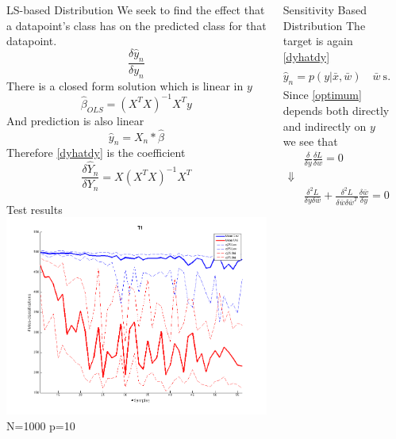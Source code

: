 \documentclass{beamer}
\newenvironment{pblock}{\begin{minipage}[b]{\linewidth}
	\begin{block}}{\end{block} 	\end{minipage}\vspace*{15pt}}
\begin{document}
{\begin{columns}[t]
\begin{column}{.3\linewidth}
	\end{column}
    \begin{column}{.3\linewidth}


	\begin{pblock}{LS-based Distribution}	
	We seek to find the effect that a datapoint's class has on the predicted class for that datapoint.
	    \begin{equation}
	    \label{dyhatdy}
	    \frac{\delta \hat{y}_n}{\delta y_n}
	    \end{equation}
	There is a closed form solution which is linear in $y$
		\begin{equation*}
			\hat{\beta}_{OLS} = \left( X^T X \right)^{-1} X^T y
		\end{equation*}
	And prediction is also linear
		\begin{equation*}
			\hat{y}_n = X_n*\hat{\beta}
		\end{equation*}
	Therefore \eqref{dyhatdy} is the coefficient
		\begin{equation*}
			\frac{\delta \hat{Y}_n}{\delta Y_n} = X \left( X^T X \right)^{-1} X^T
		\end{equation*}
	
	\end{pblock}

	\begin{pblock}{Test results}
	\includegraphics[width=.3\linewidth]{T1.png}
	N=1000 p=10
	\end{pblock}

	
	
    \end{column}
    \begin{column}{.3\linewidth}
    
    
    	\begin{pblock}{Sensitivity Based Distribution}
    	The target is again \eqref{dyhatdy} 
    	\begin{equation*}
    	\label{optimum}
    	 \hat{y}_n = p(y|\bar{x},\bar{w}) \quad \bar{w} \  \text{s.t.} \ \frac{\delta L}{\delta\bar{w}}=0
    	\end{equation*}
    	Since \ref{optimum} depends both directly and indirectly on $y$ we see that
    	\begin{eqnarray*}
    	&\frac{\delta}{\delta y} \frac{\delta L}{\delta w} = 0\\
    	\Downarrow & \\
    	&\frac{\delta^2 L}{\delta y \delta \bar{w}} + \frac{\delta^2 L}{\delta \bar{w} \delta \bar{w}^T} \frac{\delta \bar{w}}{\delta y}= 0
    	\end{eqnarray*}
    	

\end{pblock}
\end{column}
\end{columns}}
\end{document}
